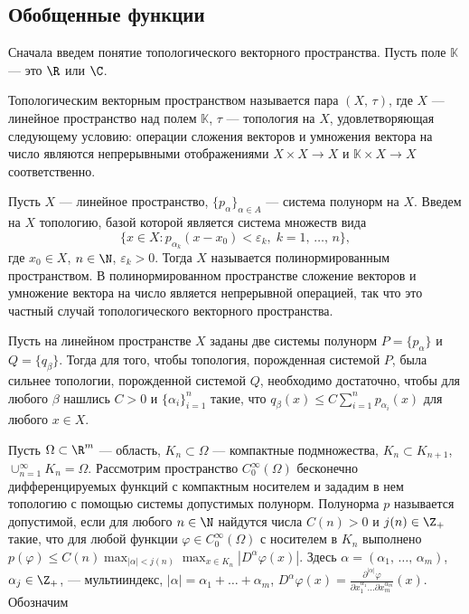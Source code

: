 \documentclass[a4paper
]{article}
\begin{document}
\subsection{Обобщенные функции}
Сначала введем понятие топологического векторного пространства. Пусть
поле $\mathbb{K}$ --- это $\R$ или $\C$.
\begin{Def}
Топологическим векторным пространством называется пара $(X, \, \tau)$,
где $X$ --- линейное пространство над полем $\mathbb{K}$, $\tau$
--- топология на $X$, удовлетворяющая следующему условию: операции
сложения векторов и умножения вектора на число являются непрерывными
отображениями $X\times X\rightarrow X$ и $\mathbb{K}\times X\rightarrow
X$ соответственно.
\end{Def}
Пусть $X$ --- линейное пространство, $\{p_{\alpha}\}_{\alpha\in A}$ ---
система полунорм на $X$. Введем на $X$ топологию, базой которой
является система множеств вида $$\{x\in X:p_{\alpha_k}(x-x_0)<\varepsilon_k,
\; k=1, \, \dots, \, n\},$$ где $x_0\in X$, $n\in \N$, $\varepsilon_k
>0$. Тогда $X$ называется полинормированным пространством. В
полинормированном пространстве сложение векторов и умножение
вектора на число является непрерывной операцией, так что это
частный случай топологического векторного пространства.
\begin{Sta}
Пусть на линейном пространстве $X$ заданы две системы полунорм
$P=\{p_\alpha\}$ и $Q=\{q_\beta\}$. Тогда для того, чтобы
топология, порожденная системой $P$, была сильнее топологии,
порожденной системой $Q$, необходимо достаточно, чтобы для любого
$\beta$ нашлись $C>0$ и $\{\alpha_i\}_{i=1}^n$ такие, что
$q_\beta(x)\le C\sum \limits_{i=1}^n p_{\alpha_i}(x)$ для любого
$x\in X$.
\end{Sta}
Пусть $\Omega \subset \R^m$ --- область, $K_n\subset \Omega$ ---
компактные подмножества, $K_n\subset K_{n+1}$, $\cup_{n=1}^\infty
K_n=\Omega$. Рассмотрим пространство $C_0^\infty(\Omega)$
бесконечно дифференцируемых функций с компактным носителем и
зададим в нем топологию с помощью системы допустимых полунорм.
Полунорма $p$ называется допустимой, если для любого $n\in \N$
найдутся числа $C(n)>0$ и $j(n)\in \Z_+$ такие, что для
любой функции $\varphi\in C_0^\infty(\Omega)$ с носителем в
$K_n$ выполнено $p(\varphi)\le
C(n) \max_{|\alpha|<j(n)}\max_{x\in K_n}|D^{\alpha}\varphi(x)|$.
Здесь $\alpha=(\alpha_1, \, \dots, \, \alpha_m)$, $\alpha_j\in
\Z_+$, --- мультииндекс, $|\alpha|=\alpha_1+\dots+\alpha_m$,
$D^\alpha\varphi(x)= \frac{\partial^{|\alpha|}\varphi}{\partial
x_1^{\alpha_1}\dots \partial x_m^{\alpha_m}}(x)$. Обозначим
\end{document}
